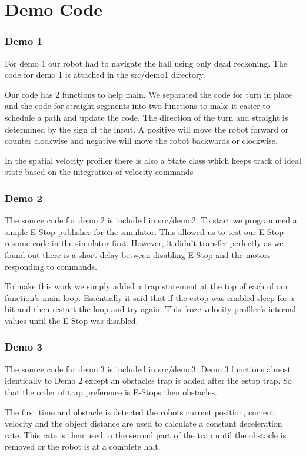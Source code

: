 \part{Demo Code}

\section{Demo 1}
For demo 1 our robot had to navigate the hall using only dead
reckoning.  The code for demo 1 is attached in the src/demo1
directory.

Our code has 2 functions to help main.  We separated the code for turn
in place and the code for straight segments into two functions to make
it easier to schedule a path and update the code. The direction of the
turn and straight is determined by the sign of the input. A positive
will move the robot forward or counter clockwise and negative will
move the robot backwards or clockwise.

In the spatial velocity profiler there is also a State class which
keeps track of ideal state based on the integration of velocity commands

\section{Demo 2}
The source code for demo 2 is included in src/demo2.
To start we programmed a simple E-Stop publisher for the simulator.
This allowed us to test our E-Stop resume code in the simulator
first.  However, it didn't transfer perfectly as we found out there is
a short delay between disabling E-Stop and the motors responding to
commands.

To make this work we simply added a trap statement at the top of each
of our function's main loop.  Essentially it said that if the estop
was enabled sleep for a bit and then restart the loop and try again.
This froze velocity profiler's internal values until the E-Stop was disabled.


\section{Demo 3}
The source code for demo 3 is included in src/demo3. Demo 3 functions
almost identically to Demo 2 except an obstacles trap is added after
the estop trap.  So that the order of trap preference is E-Stops then
obstacles.

The first time and obstacle is detected the robots current position,
current velocity and the object distance are used to calculate a
constant deceleration rate.  This rate is then used in the second part
of the trap until the obstacle is removed or the robot is at a
complete halt.

